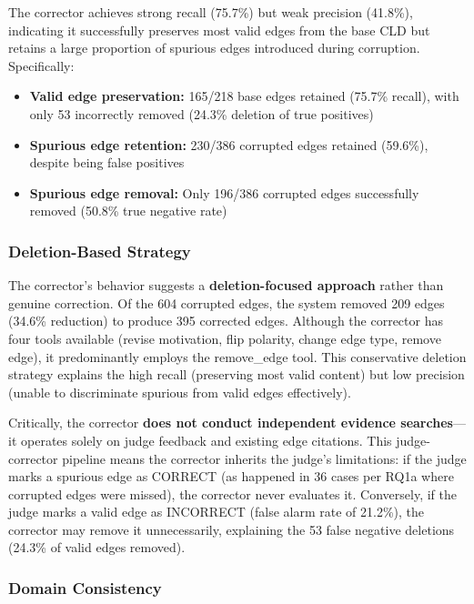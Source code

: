 The corrector achieves strong recall (75.7\%) but weak precision (41.8\%), indicating it successfully preserves most valid edges from the base CLD but retains a large proportion of spurious edges introduced during corruption. Specifically:

\begin{itemize}
    \item \textbf{Valid edge preservation:} 165/218 base edges retained (75.7\% recall), with only 53 incorrectly removed (24.3\% deletion of true positives)
    \item \textbf{Spurious edge retention:} 230/386 corrupted edges retained (59.6\%), despite being false positives
    \item \textbf{Spurious edge removal:} Only 196/386 corrupted edges successfully removed (50.8\% true negative rate)
\end{itemize}

\subsubsection{Deletion-Based Strategy}

The corrector's behavior suggests a \textbf{deletion-focused approach} rather than genuine correction. Of the 604 corrupted edges, the system removed 209 edges (34.6\% reduction) to produce 395 corrected edges. Although the corrector has four tools available (revise motivation, flip polarity, change edge type, remove edge), it predominantly employs the remove\_edge tool. This conservative deletion strategy explains the high recall (preserving most valid content) but low precision (unable to discriminate spurious from valid edges effectively).

Critically, the corrector \textbf{does not conduct independent evidence searches}---it operates solely on judge feedback and existing edge citations. This judge-corrector pipeline means the corrector inherits the judge's limitations: if the judge marks a spurious edge as CORRECT (as happened in 36 cases per RQ1a where corrupted edges were missed), the corrector never evaluates it. Conversely, if the judge marks a valid edge as INCORRECT (false alarm rate of 21.2\%), the corrector may remove it unnecessarily, explaining the 53 false negative deletions (24.3\% of valid edges removed).

\subsubsection{Domain Consistency}

